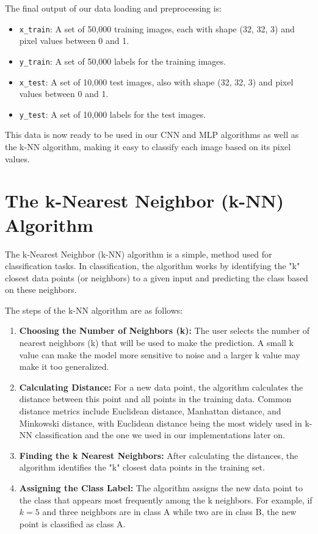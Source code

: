 \documentclass[lettersize,journal]{IEEEtran}
\begin{document}
The final output of our data loading and preprocessing is:
\begin{itemize}
    \item \texttt{x\_train}: A set of 50,000 training images, each with shape (32, 32, 3) and pixel values between 0 and 1.
    \item \texttt{y\_train}: A set of 50,000 labels for the training images.
    \item \texttt{x\_test}: A set of 10,000 test images, also with shape (32, 32, 3) and pixel values between 0 and 1.
    \item \texttt{y\_test}: A set of 10,000 labels for the test images.
\end{itemize}
\vspace{0.3cm}
This data is now ready to be used in our CNN and MLP algorithms as well as the k-NN algorithm, making it easy to classify each image based on its pixel values.


\section{The k-Nearest Neighbor (k-NN) Algorithm}

The k-Nearest Neighbor (k-NN) algorithm is a simple, method used for classification tasks. In classification, the algorithm works by identifying the "k" closest data points (or neighbors) to a given input and predicting the class based on these neighbors.

The steps of the k-NN algorithm are as follows:

\begin{enumerate}
    \item \textbf{Choosing the Number of Neighbors (k):} The user selects the number of nearest neighbors (k) that will be used to make the prediction. A small k value can make the model more sensitive to noise and a larger k value may make it too generalized.
    
    \item \textbf{Calculating Distance:} For a new data point, the algorithm calculates the distance between this point and all points in the training data. Common distance metrics include Euclidean distance, Manhattan distance, and Minkowski distance, with Euclidean distance being the most widely used in k-NN classification and the one we used in our implementations later on.
    
    \item \textbf{Finding the k Nearest Neighbors:} After calculating the distances, the algorithm identifies the "k" closest data points in the training set.
    
    \item \textbf{Assigning the Class Label:} The algorithm assigns the new data point to the class that appears most frequently among the k neighbors. For example, if $k=5$ and three neighbors are in class A while two are in class B, the new point is classified as class A.
\end{enumerate}
\end{document}
